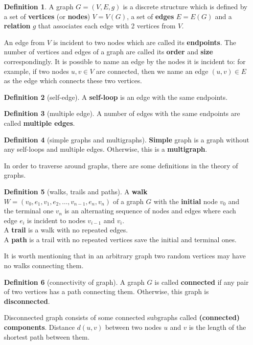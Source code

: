 \documentclass[12pt, bachelor, substylefile = algo_title.rtx]{disser}
\theoremstyle{definition}
\newtheorem{definition}{Definition}
\begin{document}
\begin{definition}
A graph $G = (V, E, g)$ is a discrete structure which is defined by a set of \textbf{vertices} (or \textbf{nodes}) $V = V(G)$, a set of \textbf{edges} $E = E(G)$ and a \textbf{relation} $g$ that associates each edge with 2 vertices from $V$.
\end{definition}

An edge from $V$ is incident to two nodes which are called its \textbf{endpoints}. The number of vertices and edges of a graph are called its \textbf{order} and \textbf{size} correspondingly. It is possible to name an edge by the nodes it is incident to: for example, if two nodes $u, v \in V$ are connected, then we name an edge $(u, v) \in E$ as the edge which connects these two vertices.

\begin{definition}[self-edge]
A \textbf{self-loop} is an edge with the same endpoints.
\end{definition}

\begin{definition}[multiple edge]
A number of edges with the same endpoints are called \textbf{multiple edges}.
\end{definition}

\begin{definition}[simple graphs and multigraphs]
\textbf{Simple} graph is a graph without any self-loops and multiple edges. Otherwise, this is a \textbf{multigraph}.
\end{definition}

In order to traverse around graphs, there are some definitions in the theory of graphs.

\begin{definition}[walks, trails and paths]
A \textbf{walk} $W = (v_0, e_1, v_1, e_2, \dots, v_{n-1}, e_n, v_n)$ of a graph $G$ with the \textbf{initial} node $v_0$ and the terminal one $v_n$ is an alternating sequence of nodes and edges where each edge $e_i$ is incident to nodes $v_{i-1}$ and $v_i$.\\
A \textbf{trail} is a walk with no repeated edges.\\
A \textbf{path} is a trail with no repeated vertices save the initial and terminal ones.
\end{definition}

It is worth mentioning that in an arbitrary graph two random vertices may have no walks connecting them.
\begin{definition}[connectivity of graph]
A graph $G$ is called \textbf{connected} if any pair of two vertices has a path connecting them. Otherwise, this graph is \textbf{disconnected}.
\end{definition}
\noindent
Disconnected graph consists of some connected subgraphs called \textbf{(connected) components}.
Distance $d(u, v)$ between two nodes $u$ and $v$ is the length of the shortest path between them.
\end{document}
